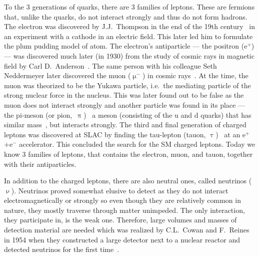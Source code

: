 To the 3 generations of quarks, there are 3 families of leptons. These are fermions that, unlike the quarks, do not interact strongly and thus do not form hadrons. The electron was discovered by J.J.\ Thompson in the end of the 19th century~\cite{thomson1897cathode} in an experiment with a cathode in an electric field\@. This later led him to formulate the plum pudding model of atom. The electron's antiparticle --- the positron (e$^+$) --- was discovered much later (in 1930) from the study of cosmic rays in magnetic field by Carl D.\ Anderson~\cite{positron}\@. The same person with his colleague Seth Neddermeyer later discovered the muon ($\upmu^-$) in cosmic rays~\cite{muon}\@. At the time, the muon was theorized to be the Yukawa particle, i.e.\ the mediating particle of the strong nuclear force in the nucleus. This was later found out to be false as the muon does not interact strongly and another particle was found in its place --- the pi-meson (or pion,~$\uppi$)~\cite{pion} a meson (consisting of the u and d quarks) that has similar mass~\cite{PDG}, but interacts strongly. The third and final generation of charged leptons was discovered at SLAC by finding the tau-lepton (tauon, $\uptau$)~\cite{tau} at an e$^+$+e$^-$ accelerator\@. This concluded the search for the SM charged leptons. Today we know 3 families of leptons, that contains the electron, muon, and tauon, together with their antiparticles.

In addition to the charged leptons, there are also neutral ones, called neutrinos ($\upnu$)\@. %
Neutrinos proved somewhat elusive to detect as they do not interact electromagnetically or strongly so even though they are relatively common in nature, they mostly traverse through matter unimpeded. The only interaction, they participate in, is the weak one. Therefore, large volumes and masses of detection material are needed which was realized by C.L.\ Cowan and F.\ Reines in 1954 when they constructed a large detector next to a nuclear reactor and detected neutrinos for the first time~\cite{CowanNeutrinos}\@.

